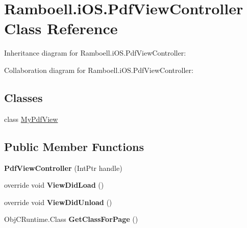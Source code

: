 \hypertarget{class_ramboell_1_1i_o_s_1_1_pdf_view_controller}{}\section{Ramboell.\+i\+O\+S.\+Pdf\+View\+Controller Class Reference}
\label{class_ramboell_1_1i_o_s_1_1_pdf_view_controller}


Inheritance diagram for Ramboell.\+i\+O\+S.\+Pdf\+View\+Controller\+:


Collaboration diagram for Ramboell.\+i\+O\+S.\+Pdf\+View\+Controller\+:
\subsection*{Classes}
\begin{DoxyCompactItemize}
\item 
class \hyperlink{class_ramboell_1_1i_o_s_1_1_pdf_view_controller_1_1_my_pdf_view}{My\+Pdf\+View}
\end{DoxyCompactItemize}
\subsection*{Public Member Functions}
\begin{DoxyCompactItemize}
\item 
\mbox{\label{class_ramboell_1_1i_o_s_1_1_pdf_view_controller_a51b992b2b10ea7341a981b49cc1b6216}} 
{\bfseries Pdf\+View\+Controller} (Int\+Ptr handle)
\item 
\mbox{\label{class_ramboell_1_1i_o_s_1_1_pdf_view_controller_a6ffe0642ee3a6af8e624afe3b9450943}} 
override void {\bfseries View\+Did\+Load} ()
\item 
\mbox{\label{class_ramboell_1_1i_o_s_1_1_pdf_view_controller_a203e0e87fd40da6f90ffbe9ffe96c65f}} 
override void {\bfseries View\+Did\+Unload} ()
\item 
\mbox{\label{class_ramboell_1_1i_o_s_1_1_pdf_view_controller_a2d7a663fc7396055d1a38753e1910ade}} 
Obj\+C\+Runtime.\+Class {\bfseries Get\+Class\+For\+Page} ()
\end{DoxyCompactItemize}
